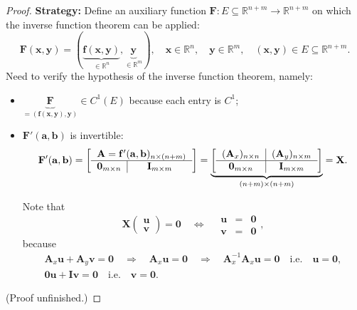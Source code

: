 \documentclass[letterpaper, reqno,11pt]{article}
\newcommand{\RR}{\mathbb{R}}
\begin{document}
\begin{proof}
  \renewcommand{\qedsymbol}{}
  
  {\bf Strategy:} Define an auxiliary function $\mathbf F : E \subseteq \RR^{n + m} \to \RR^{n + m}$ on which the inverse function theorem can be applied:
  \[ \mathbf F(\mathbf x, \mathbf y) = (\underbrace{\mathbf f(\mathbf x, \mathbf y)}_{\in \RR^n}, \underbrace{\mathbf y}_{\in \RR^m}), \quad \mathbf x \in \RR^n, \quad \mathbf y \in \RR^m, \quad (\mathbf x, \mathbf y) \in E \subseteq \RR^{n + m}. \]
  Need to verify the hypothesis of the inverse function theorem, namely:
  \begin{itemize}
  \item $\underbrace{\mathbf F}_{= (\mathbf f(\mathbf x, \mathbf y), \mathbf y)} \in C^1(E)$ because each entry is $C^1$;
  \item $\mathbf F'(\mathbf a, \mathbf b)$ is invertible:
    \[ \mathbf F'(\mathbf a, \mathbf b) = \left[
      \begin{tabular}{c|c}
        \multicolumn{2}{c}{$\mathbf A = \mathbf f'(\mathbf a, \mathbf b)_{n \times (n + m)}$} \\
        \hline
        $\mathbf 0_{m \times n}$ & $\mathbf I_{m \times m}$
      \end{tabular}
      \right] = \underbrace{\left[
    \begin{tabular}{c|c}
      $(\mathbf A_x)_{n \times n}$ & $(\mathbf A_y)_{n \times m}$ \\
      \hline
      $\mathbf 0_{m \times n}$ & $\mathbf I_{m \times m}$
    \end{tabular}
    \right]}_{(n + m) \times (n + m)} = \mathbf X. \]

    Note that
    \[ \mathbf X
    \begin{pmatrix}
      \mathbf u \\
      \mathbf v
    \end{pmatrix}
    = \mathbf 0 \quad \Leftrightarrow \quad
    \begin{array}{lcl}
      \mathbf u &=& \mathbf 0 \\
      \mathbf v &=& \mathbf 0
    \end{array}, \]
    because
    \begin{gather*}
      \mathbf A_x \mathbf u + \mathbf A_y \mathbf v = \mathbf 0 \quad \Rightarrow \quad \mathbf A_x \mathbf u = \mathbf 0 \quad \Rightarrow \quad \mathbf A_x^{-1} \mathbf A_x \mathbf u = \mathbf 0 \quad \text{i.e.} \quad \mathbf u = \mathbf 0, \\
      \mathbf 0 \mathbf u + \mathbf I \mathbf v = \mathbf 0 \quad \text{i.e.} \quad \mathbf v = \mathbf 0.
    \end{gather*}
  \end{itemize}

  (Proof unfinished.)
\end{proof}
\end{document}
